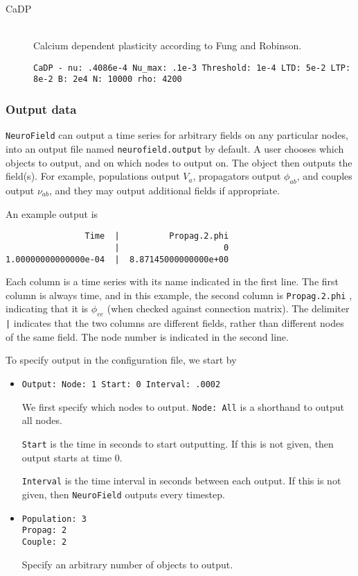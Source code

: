 \documentclass[12pt,a4paper]{article}
\newcommand{\type}[1]{ {\small\small\tt #1} }
\begin{document}
\begin{itemize}
\begin{description}
	\item[CaDP]\ \\
	Calcium dependent plasticity according to Fung and Robinson.
	\begin{lstlisting}
CaDP - nu: .4086e-4 Nu_max: .1e-3 Threshold: 1e-4 LTD: 5e-2 LTP: 8e-2 B: 2e4 N: 10000 rho: 4200
	\end{lstlisting}

\end{description}
\end{itemize}

\subsubsection{Output data}
\label{sec:output}

\type{NeuroField} can output a time series for arbitrary fields on any particular nodes, into an output file named \type{neurofield.output} by default. A user chooses which objects to output, and on which nodes to output on. The object then outputs the field(s). For example, populations output $V_a$, propagators output $\phi_{ab}$, and couples output $\nu_{ab}$, and they may output additional fields if appropriate.

An example output is
\begin{lstlisting}
                Time  |          Propag.2.phi
                      |                     0
1.00000000000000e-04  |  8.87145000000000e+00
\end{lstlisting}

Each column is a time series with its name indicated in the first line. The first column is always time, and in this example, the second column is \type{Propag.2.phi}, indicating that it is $\phi_{ee}$ (when checked against connection matrix). The delimiter \type{|} indicates that the two columns are different fields, rather than different nodes of the same field. The node number is indicated in the second line.

To specify output in the configuration file, we start by 
\begin{itemize}
	\item
	\begin{lstlisting}
Output: Node: 1 Start: 0 Interval: .0002
	\end{lstlisting}
	We first specify which nodes to output. \type{Node: All} is a shorthand to output all nodes.

	\type{Start} is the time in seconds to start outputting. If this is not given, then output starts at time 0.

	\type{Interval} is the time interval in seconds between each output. If this is not given, then \type{NeuroField} outputs every timestep.

\item
	\begin{lstlisting}
Population: 3
Propag: 2
Couple: 2
	\end{lstlisting}
	Specify an arbitrary number of objects to output.

\end{itemize}
\end{document}
